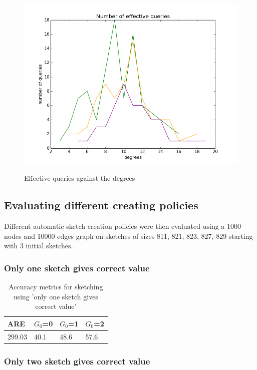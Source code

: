 \documentclass[12pt]{report}
\numberwithin{figure}{section}
\numberwithin{table}{section}
\begin{document}
\begin{figure}[H]
\centering
\includegraphics[scale=0.6]{images/deviation-plot-error-AS-2init-2scale-0t-n1000-e10000-sketches-811-821-823-827-829plot}
\label{fig:effective-queries-against-degree}
\caption{ Effective queries against the degrees }
\end{figure}

\subsection{Evaluating different creating policies}

Different automatic sketch creation policies were then evaluated using a 1000 nodes and  10000 edges graph on sketches of sizes 811, 821, 823, 827, 829 starting with 3 initial sketches.

\subsubsection{Only one sketch gives correct value}

\begin{table}[H]
\centering
\begin{tabular}{|l|l|l|l|}
\hline
 ARE   & $G_0$=0 & $G_0$=1 & $G_0$=2 \\ \hline
299.03 &   40.1  &   48.6  &   57.6  \\ \hline
\end{tabular}
\caption{Accuracy metrics for sketching using 'only one sketch gives correct value'}
\end{table}

\subsubsection{Only two sketch gives correct value}
\end{document}
